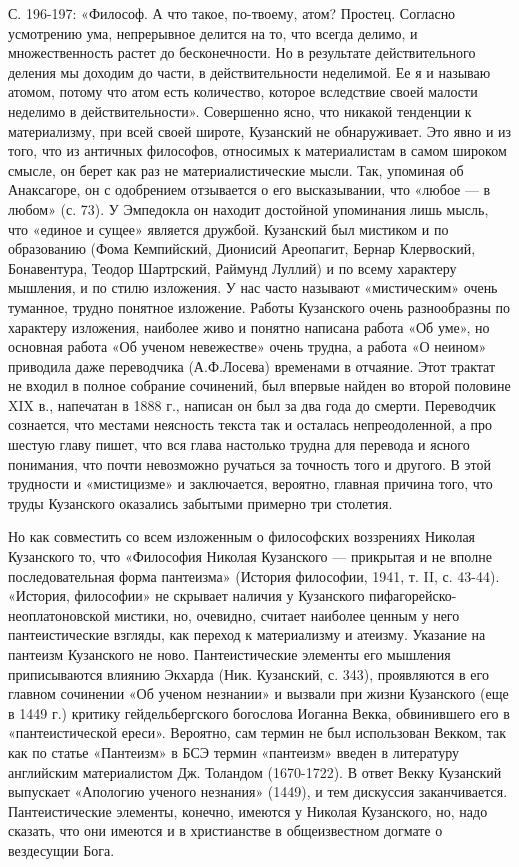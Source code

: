 С. 196-197: «Философ. А что такое, по-твоему, атом? Простец. Согласно
усмотрению ума, непрерывное делится на то, что всегда делимо, и
множественность растет до бесконечности. Но в результате
действительного деления мы доходим до части, в действительности
неделимой. Ее я и называю атомом, потому что атом есть количество,
которое вследствие своей малости неделимо в действительности».
Совершенно ясно, что никакой тенденции к материализму, при всей своей
широте, Кузанский не обнаруживает. Это явно и из того, что из античных
философов, относимых к материалистам в самом широком смысле, он берет
как раз не материалистические мысли. Так, упоминая об Анаксагоре, он с
одобрением отзывается о его высказывании, что «любое --- в любом» (с.
73). У Эмпедокла он находит достойной упоминания лишь мысль, что
«единое и сущее» является дружбой. Кузанский был мистиком и по
образованию (Фома Кемпийский, Дионисий Ареопагит, Бернар Клервоский,
Бонавентура, Теодор Шартрский, Раймунд Луллий) и по всему характеру
мышления, и по стилю изложения. У нас часто называют «мистическим»
очень туманное, трудно понятное изложение. Работы Кузанского очень
разнообразны по характеру изложения, наиболее живо и понятно написана
работа «Об уме», но основная работа «Об ученом невежестве» очень
трудна, а работа «О неином» приводила даже переводчика (А.Ф.Лосева)
временами в отчаяние. Этот трактат не входил в полное собрание
сочинений, был впервые найден во второй половине XIX в., напечатан в
1888 г., написан он был за два года до смерти. Переводчик сознается,
что местами неясность текста так и осталась непреодоленной, а про
шестую главу пишет, что вся глава настолько трудна для перевода и
ясного понимания, что почти невозможно ручаться за точность того и
другого. В этой трудности и «мистицизме» и заключается, вероятно,
главная причина того, что труды Кузанского оказались забытыми примерно
три столетия.

Но как совместить со всем изложенным о философских воззрениях Николая
Кузанского то, что «Философия Николая Кузанского --- прикрытая и не
вполне последовательная форма пантеизма» (История философии, 1941, т.
II, с. 43-44). «История, философии» не скрывает наличия у Кузанского
пифагорейско-неоплатоновской мистики, но, очевидно, считает наиболее
ценным у него пантеистические взгляды, как переход к материализму и
атеизму. Указание на пантеизм Кузанского не ново. Пантеистические
элементы его мышления приписываются влиянию Экхарда (Ник. Кузанский,
с. 343), проявляются в его главном сочинении «Об ученом незнании» и
вызвали при жизни Кузанского (еще в 1449 г.) критику гейдельбергского
богослова Иоганна Векка, обвинившего его в «пантеистической ереси».
Вероятно, сам термин не был использован Векком, так как по статье
«Пантеизм» в БСЭ термин «пантеизм» введен в литературу английским
материалистом Дж. Толандом (1670-1722). В ответ Векку Кузанский
выпускает «Апологию ученого незнания» (1449), и тем дискуссия
заканчивается. Пантеистические элементы, конечно, имеются у Николая
Кузанского, но, надо сказать, что они имеются и в христианстве в
общеизвестном догмате о вездесущии Бога.

